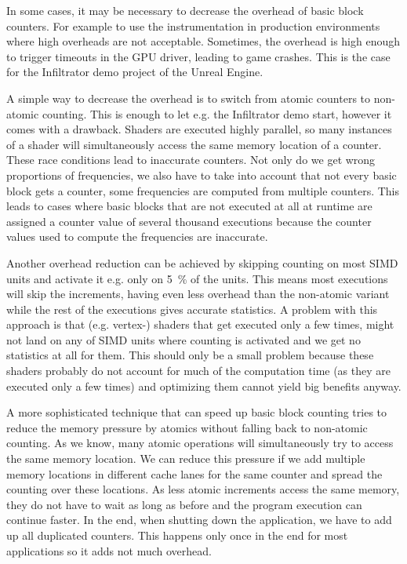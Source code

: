 

\begin{figure}
\centering
{}
\label{tab:overhead}
\end{figure}


In some cases, it may be necessary to decrease the overhead of basic block counters. For example to use the instrumentation in production environments where high overheads are not acceptable.
Sometimes, the overhead is high enough to trigger timeouts in the GPU driver, leading to game crashes. This is the case for the Infiltrator demo project of the Unreal Engine.

A simple way to decrease the overhead is to switch from atomic counters to non-atomic counting. This is enough to let e.g. the Infiltrator demo start, however it comes with a drawback. Shaders are executed highly parallel, so many instances of a shader will simultaneously access the same memory location of a counter.
These race conditions lead to inaccurate counters. Not only do we get wrong proportions of frequencies, we also have to take into account that not every basic block gets a counter, some frequencies are computed from multiple counters. This leads to cases where basic blocks that are not executed at all at runtime are assigned a counter value of several thousand executions because the counter values used to compute the frequencies are inaccurate.

Another overhead reduction can be achieved by skipping counting on most SIMD units and activate it e.g. only on \SI{5}{\percent} of the units.
This means most executions will skip the increments, having even less overhead than the non-atomic variant while the rest of the executions gives accurate statistics.
A problem with this approach is that (e.g. vertex-) shaders that get executed only a few times, might not land on any of SIMD units where counting is activated and we get no statistics at all for them.
This should only be a small problem because these shaders probably do not account for much of the computation time (as they are executed only a few times) and optimizing them cannot yield big benefits anyway.

A more sophisticated technique that can speed up basic block counting tries to reduce the memory pressure by atomics without falling back to non-atomic counting. As we know, many atomic operations will simultaneously try to access the same memory location.
We can reduce this pressure if we add multiple memory locations in different cache lanes for the same counter and spread the counting over these locations. As less atomic increments access the same memory, they do not have to wait as long as before and the program execution can continue faster.
In the end, when shutting down the application, we have to add up all duplicated counters. This happens only once in the end for most applications so it adds not much overhead.
